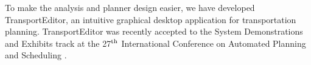 To make the analysis and planner design easier, we have developed TransportEditor,
an intuitive graphical desktop application for transportation planning.
TransportEditor was recently accepted to the System Demonstrations and Exhibits
track at the 27$^{\textrm{th}}$ International Conference on Automated Planning and Scheduling \citep{Skopek2017}. 
